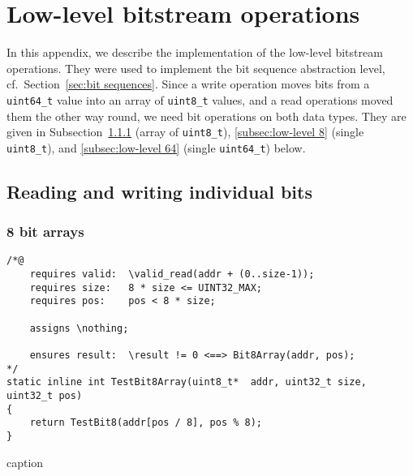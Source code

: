 
\chapter{Low-level bitstream operations}
\label{cha:low-level bitstream}

In this appendix, we describe the implementation of the
low-level bitstream operations.
%
They were used to implement the bit sequence abstraction level, cf.\
Section~\ref{sec:bit sequences}.
%
Since a write operation moves bits from a \lstinline{uint64_t} value into an array of
\lstinline{uint8_t} values, and a read operations moved them the other way round,
we need bit operations on both data types.
%
They are given in
Subsection~\ref{subsec:low-level 8 array} (array of \lstinline{uint8_t}), 
\ref{subsec:low-level 8} (single \lstinline{uint8_t}), and
\ref{subsec:low-level 64} (single \lstinline{uint64_t}) below.



\section{Reading and writing individual bits}








\subsection{8 bit arrays}
\label{subsec:low-level 8 array}





\begin{listing}[hbt]
\begin{minipage}{0.99\textwidth}
\begin{lstlisting}[style=acsl-block]
/*@
    requires valid:  \valid_read(addr + (0..size-1));
    requires size:   8 * size <= UINT32_MAX;
    requires pos:    pos < 8 * size;

    assigns \nothing;

    ensures result:  \result != 0 <==> Bit8Array(addr, pos);
*/
static inline int TestBit8Array(uint8_t*  addr, uint32_t size, uint32_t pos)
{
    return TestBit8(addr[pos / 8], pos % 8);
}
\end{lstlisting}
\end{minipage}
\caption{caption}
\end{listing}






